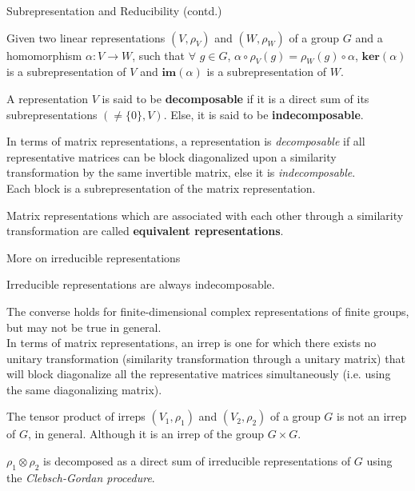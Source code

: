 \documentclass{beamer}
\newcommand\boldtext[1]{\textcolor{bolds}{\textbf{#1}}}
\newcommand\italictext[1]{\textcolor{italics}{\textit{#1}}}
\begin{document}
\begin{frame}{Subrepresentation and Reducibility (contd.)}
    \begin{theorem}
        Given two linear representations $(V,\rho_V)$ and $(W,\rho_W)$ of a group $G$ and a homomorphism $\alpha:V\xrightarrow{}W$, such that $\forall$ $g\in G$, $\alpha\circ\rho_V(g)=\rho_W(g)\circ\alpha$, $\mathbf{ker}(\alpha)$ is a subrepresentation of $V$ and $\mathbf{im}(\alpha)$ is a subrepresentation of $W$. 
    \end{theorem}
    \begin{definition}
        A representation $V$ is said to be \boldtext{decomposable} if it is a direct sum of its subrepresentations $(\neq\{0\},V)$. Else, it is said to be \boldtext{indecomposable}.
    \end{definition}
    In terms of matrix representations, a representation is \italictext{decomposable} if all representative matrices can be block diagonalized upon a similarity transformation by the same invertible matrix, else it is \italictext{indecomposable}.\\
    Each block is a subrepresentation of the matrix representation.
    \begin{definition}
        Matrix representations which are associated with each other through a similarity transformation are called \boldtext{equivalent representations}.
    \end{definition}
\end{frame}

\begin{frame}{More on irreducible representations}
    \begin{theorem}
        Irreducible representations are always indecomposable.
    \end{theorem}
    The converse holds for finite-dimensional complex representations of finite groups, but may not be true in general.\\
    In terms of matrix representations, an irrep is one for which there exists no unitary transformation (similarity transformation through a unitary matrix) that will block diagonalize all the representative matrices simultaneously (i.e. using the same diagonalizing matrix).\\
    \begin{theorem}
        The tensor product of irreps $(V_1,\rho_1)$ and $(V_2,\rho_2)$ of a group $G$ is not an irrep of $G$, in general. Although it is an irrep of the group $G\times G$.
    \end{theorem}
    $\rho_1\otimes\rho_2$ is decomposed as a direct sum of irreducible representations of $G$ using the \italictext{Clebsch-Gordan procedure}.
\end{frame}
\end{document}
